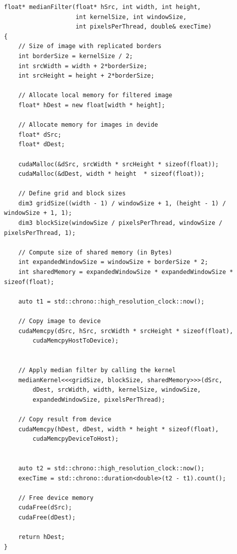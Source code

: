 \documentclass[11pt,a4paper]{article}
\begin{document}
\begin{lstlisting}
float* medianFilter(float* hSrc, int width, int height,
					int kernelSize, int windowSize,
					int pixelsPerThread, double& execTime)
{
    // Size of image with replicated borders
    int borderSize = kernelSize / 2;
    int srcWidth = width + 2*borderSize;
    int srcHeight = height + 2*borderSize;

    // Allocate local memory for filtered image
    float* hDest = new float[width * height];

    // Allocate memory for images in devide
    float* dSrc;
    float* dDest;

    cudaMalloc(&dSrc, srcWidth * srcHeight * sizeof(float));
    cudaMalloc(&dDest, width * height  * sizeof(float));

    // Define grid and block sizes
    dim3 gridSize((width - 1) / windowSize + 1, (height - 1) / windowSize + 1, 1);
    dim3 blockSize(windowSize / pixelsPerThread, windowSize / pixelsPerThread, 1);

    // Compute size of shared memory (in Bytes)
    int expandedWindowSize = windowSize + borderSize * 2;
    int sharedMemory = expandedWindowSize * expandedWindowSize * sizeof(float);

    auto t1 = std::chrono::high_resolution_clock::now();

    // Copy image to device
    cudaMemcpy(dSrc, hSrc, srcWidth * srcHeight * sizeof(float),
    	cudaMemcpyHostToDevice);


    // Apply median filter by calling the kernel
    medianKernel<<<gridSize, blockSize, sharedMemory>>>(dSrc,
    	dDest, srcWidth, width, kernelSize, windowSize, 
    	expandedWindowSize, pixelsPerThread);

    // Copy result from device
    cudaMemcpy(hDest, dDest, width * height * sizeof(float),
    	cudaMemcpyDeviceToHost);


    auto t2 = std::chrono::high_resolution_clock::now();
    execTime = std::chrono::duration<double>(t2 - t1).count();

    // Free device memory
    cudaFree(dSrc);
    cudaFree(dDest);

    return hDest;
}
\end{lstlisting}
\end{document}
